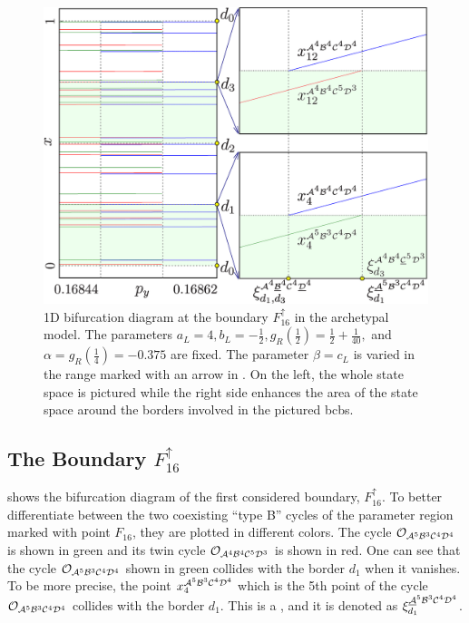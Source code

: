 \begin{figure}
	\centering
	\includegraphics[width=.7 \textwidth]{../Figures/6/6.6/result.png}
	\caption[1D bifurcation diagram at the boundary $F_{16}^\uparrow$ in the archetypal model]{
		1D bifurcation diagram at the boundary $F_{16}^\uparrow$ in the archetypal model.
		The parameters $a_L = 4, b_L = -\frac{1}{2}, g_R\left(\frac{1}{2}\right) = \frac{1}{2} + \frac{1}{40},$ and $\alpha = g_R\left(\frac{1}{4}\right) = -0.375$ are fixed.
		The parameter $\beta = c_L$ is varied in the range marked with an arrow in .
		On the left, the whole state space is pictured while the right side enhances the area of the state space around the borders involved in the pictured \glspl{bcb}.
	}
	\label{fig:arch.bif.F.up}
\end{figure}

\clearpage
\subsection{The Boundary $F_{16}^\uparrow$}
\label{sec:arch.bif.U}

 shows the bifurcation diagram of the first considered boundary, $F_{16}^\uparrow$.
To better differentiate between the two coexisting ``type B'' cycles of the parameter region marked with point $F_{16}$, they are plotted in different colors.
The cycle $\mathcal{O}_{\mathcal{A}^5\mathcal{B}^3\mathcal{C}^4\mathcal{D}^4}$ is shown in green and its twin cycle $\mathcal{O}_{\mathcal{A}^4\mathcal{B}^4\mathcal{C}^5\mathcal{D}^3}$ is shown in  red.
One can see that the cycle $\mathcal{O}_{\mathcal{A}^5\mathcal{B}^3\mathcal{C}^4\mathcal{D}^4}$ shown in green collides with the border $d_1$ when it vanishes.
To be more precise, the point $x_4^{\mathcal{A}^5\mathcal{B}^3\mathcal{C}^4\mathcal{D}^4}$ which is the 5th point of the cycle $\mathcal{O}_{\mathcal{A}^5\mathcal{B}^3\mathcal{C}^4\mathcal{D}^4}$ collides with the border $d_1$.
This is a , and it is denoted as $\xi_{d_1}^{\underline{\mathcal{A}}^5\mathcal{B}^3\mathcal{C}^4\mathcal{D}^4}$.

